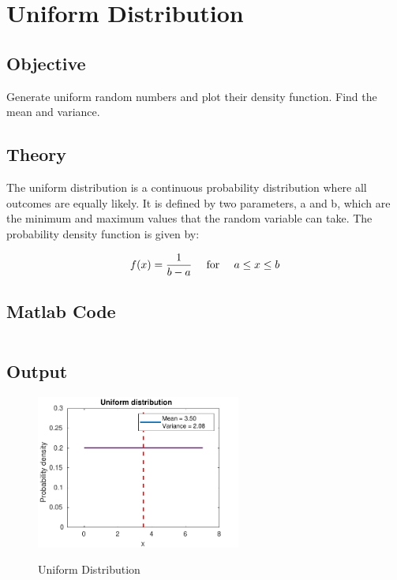 \section{Uniform Distribution}
\label{sec:Uniform density function}

\subsection{Objective}
Generate uniform random numbers and plot
their density function. Find the mean and variance.

\subsection{Theory}
The uniform distribution is a continuous probability distribution where all outcomes are equally likely.
It is defined by two parameters, a and b, which are the minimum and maximum values that the random variable can take.
The probability density function is given by:

\begin{equation}
    f(x) = \frac{1}{b-a} \quad \textnormal{ for } \quad a \leq x \leq b
\end{equation}

\subsection{Matlab Code}
\inputminted[fontsize=\footnotesize,autogobble]{matlab}{code/uniform.m}

\subsection{Output}

\begin{figure}[!htb]
    \centering
    \includegraphics[width=0.6\textwidth]{res/figures/Figure_5.pdf}
    \label{output:uniform distribution}
    \caption{Uniform Distribution}
\end{figure}